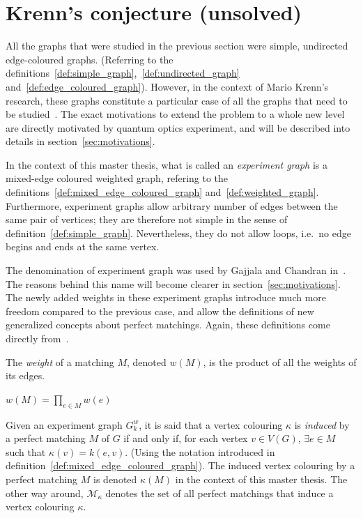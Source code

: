 \section{Krenn's conjecture (unsolved)}
\label{sec:krenn_conjecture}

All the graphs that were studied in the previous section were simple, undirected edge-coloured graphs.
(Referring to the definitions~\ref{def:simple_graph},~\ref{def:undirected_graph} and~\ref{def:edge_coloured_graph}).
However, in the context of Mario Krenn's research, these graphs constitute a particular case of all the graphs that need to be studied~\cite{Krenn_2017,wordpress}.
The exact motivations to extend the problem to a whole new level are directly motivated by quantum optics experiment, and will be described into details in section~\ref{sec:motivations}.

\begin{definition}
    \label{def:experiment_graph}
    In the context of this master thesis, what is called an \textit{experiment graph} is a mixed-edge coloured weighted graph, refering to the definitions~\ref{def:mixed_edge_coloured_graph} and~\ref{def:weighted_graph}.
    Furthermore, experiment graphs allow arbitrary number of edges between the same pair of vertices; they are therefore not simple in the sense of definition~\ref{def:simple_graph}.
    Nevertheless, they do not allow loops, i.e.\ no edge begins and ends at the same vertex.
\end{definition}

The denomination of experiment graph was used by Gajjala and Chandran in~\cite{chandran2023graphtheoretic}.
The reasons behind this name will become clearer in section~\ref{sec:motivations}.
The newly added weights in these experiment graphs introduce much more freedom compared to the previous case, and allow the definitions of new generalized concepts about perfect matchings.
Again, these definitions come directly from~\cite{wordpress}.

\begin{definition}
    \label{def:matching_weight}
    The \textit{weight} of a matching $M$, denoted $w(M)$, is the product of all the weights of its edges.
    \begin{center}
        $w(M) = \prod\limits_{e \in M}w(e)$
    \end{center}
\end{definition}

\begin{definition}
    \label{def:induced_vertex_colouring}
    Given an experiment graph $G_k^w$, it is said that a vertex colouring $\kappa$ is \textit{induced} by a perfect matching $M$ of $G$ if and only if, for each vertex $v \in V(G)$, $\exists e \in M$ such that $\kappa(v) = k(e, v)$.
    (Using the notation introduced in definition~\ref{def:mixed_edge_coloured_graph}).
    The induced vertex colouring by a perfect matching $M$ is denoted $\kappa(M)$ in the context of this master thesis.
    The other way around, $\mathcal{M}_\kappa$ denotes the set of all perfect matchings that induce a vertex colouring $\kappa$.
\end{definition}

